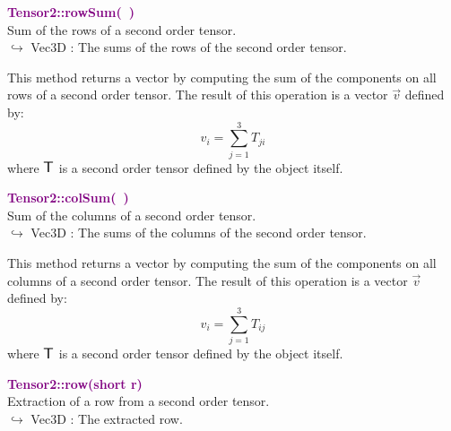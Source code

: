 \textcolor{purple}{\textbf{Tensor2::rowSum(~)}}\label{Tensor2::rowSum()}\\
Sum of the rows of a second order tensor.\\ \hspace*{10mm}$\hookrightarrow$ Vec3D : The sums of the rows of the second order tensor.

This method returns a vector by computing the sum of the components on all rows of a second order tensor.
The result of this operation is a vector $\overrightarrow{v}$ defined by:
\begin{equation*}
v_{i}=\sum_{j=1}^{3} T_{ji}
\end{equation*}
where $\mbox{\large\ensuremath{\mathsf{T}}}$ is a second order tensor defined by the object itself.

\textcolor{purple}{\textbf{Tensor2::colSum(~)}}\label{Tensor2::colSum()}\\
Sum of the columns of a second order tensor.\\ \hspace*{10mm}$\hookrightarrow$ Vec3D : The sums of the columns of the second order tensor.

This method returns a vector by computing the sum of the components on all columns of a second order tensor.
The result of this operation is a vector $\overrightarrow{v}$ defined by:
\begin{equation*}
v_{i}=\sum_{j=1}^{3}T_{ij}
\end{equation*}
where $\mbox{\large\ensuremath{\mathsf{T}}}$ is a second order tensor defined by the object itself.

\textcolor{purple}{\textbf{Tensor2::row(short r)}}\label{Tensor2::row(short r)}\\
Extraction of a row from a second order tensor.\\ \hspace*{10mm}$\hookrightarrow$ Vec3D : The extracted row.

